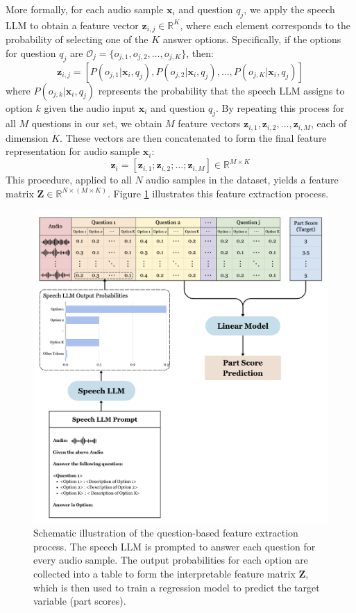 \documentclass{report}
\begin{document}
More formally, for each audio sample $\mathbf{x}_i$ and question $q_j$, we apply the speech LLM to obtain a feature vector $\mathbf{z}_{i,j} \in \mathbb{R}^K$, where each element corresponds to the probability of selecting one of the $K$ answer options. Specifically, if the options for question $q_j$ are $\mathcal{O}_j = \{o_{j,1}, o_{j,2}, \ldots, o_{j,K}\}$, then:
$$\mathbf{z}_{i,j} = [P(o_{j,1} | \mathbf{x}_i, q_j), P(o_{j,2} | \mathbf{x}_i, q_j), \ldots, P(o_{j,K} | \mathbf{x}_i, q_j)]$$
where $P(o_{j,k} | \mathbf{x}_i, q_j)$ represents the probability that the speech LLM assigns to option $k$ given the audio input $\mathbf{x}_i$ and question $q_j$. By repeating this process for all $M$ questions in our set, we obtain $M$ feature vectors $\mathbf{z}_{i,1}, \mathbf{z}_{i,2}, \ldots, \mathbf{z}_{i,M}$, each of dimension $K$. These vectors are then concatenated to form the final feature representation for audio sample $\mathbf{x}_i$:
$$\mathbf{z}_i = [\mathbf{z}_{i,1}; \mathbf{z}_{i,2}; \ldots; \mathbf{z}_{i,M}] \in \mathbb{R}^{M \times K}$$
This procedure, applied to all $N$ audio samples in the dataset, yields a feature matrix $\mathbf{Z} \in \mathbb{R}^{N \times (M \times K)}$. Figure \ref{fig:question_based_approach} illustrates this feature extraction process.
\begin{figure}[h]
  \centering
  \includegraphics[width=1\linewidth]{images/overall_method_schematic.png}
  \caption{Schematic illustration of the question-based feature extraction process. The speech LLM is prompted to answer each question for every audio sample. The output probabilities for each option are collected into a table to form the interpretable feature matrix $\mathbf{Z}$, which is then used to train a regression model to predict the target variable (part scores).}
  \label{fig:question_based_approach}
\end{figure}
\end{document}
